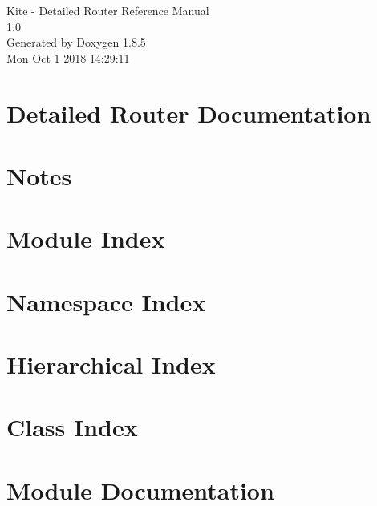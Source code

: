 \documentclass[a4paper]{asimbook}
\begin{document}
   \begin{titlepage}
     \vspace*{7cm}
     \begin{center}
     {\Large Kite - Detailed Router Reference Manual\\[1ex]\large 1.0 }\\
     \vspace*{1cm}
     {\large Generated by Doxygen 1.8.5}\\
     \vspace*{0.5cm}
     {\small Mon Oct 1 2018 14:29:11}\\
     \end{center}
   \end{titlepage}

   \clearemptydoublepage

   \tableofcontents
   \clearemptydoublepage

\section{Detailed Router Documentation}
\label{index}\hypertarget{index}{}
\section{Notes}
\label{pageNotes}
\hypertarget{pageNotes}{}

\section{Module Index}

\section{Namespace Index}

\section{Hierarchical Index}

\section{Class Index}

\section{Module Documentation}


\end{document}

